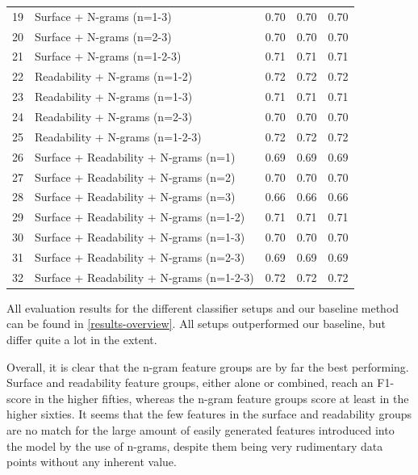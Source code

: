 \documentclass[
10pt, %
a4paper, %
oneside, %
headinclude,footinclude, %
] {book}%
\begin{document}
\begin{table}[]
\begin{tabular}{@{}lllll@{}}
19 & Surface + N-grams (n=1-3)                 & 0.70          & 0.70       & 0.70 \\
20 & Surface + N-grams (n=2-3)                 & 0.70          & 0.70       & 0.70 \\
21 & Surface + N-grams (n=1-2-3)               & 0.71          & 0.71       & 0.71 \\
22 & Readability + N-grams (n=1-2)             & 0.72          & 0.72       & 0.72 \\
23 & Readability + N-grams (n=1-3)             & 0.71          & 0.71       & 0.71 \\
24 & Readability + N-grams (n=2-3)             & 0.70          & 0.70       & 0.70 \\
25 & Readability + N-grams (n=1-2-3)           & 0.72          & 0.72       & 0.72 \\
26 & Surface + Readability + N-grams (n=1)     & 0.69          & 0.69       & 0.69 \\
27 & Surface + Readability + N-grams (n=2)     & 0.70          & 0.70       & 0.70 \\
28 & Surface + Readability + N-grams (n=3)     & 0.66          & 0.66       & 0.66 \\
29 & Surface + Readability + N-grams (n=1-2)   & 0.71          & 0.71       & 0.71 \\
30 & Surface + Readability + N-grams (n=1-3)   & 0.70          & 0.70       & 0.70 \\
31 & Surface + Readability + N-grams (n=2-3)   & 0.69          & 0.69       & 0.69 \\
32 & Surface + Readability + N-grams (n=1-2-3) & 0.72          & 0.72       & 0.72 \\ \bottomrule
\end{tabular}
\end{table}

All evaluation results for the different classifier setups and our baseline method can be found in \autoref{results-overview}. All setups outperformed our baseline, but differ quite a lot in the extent. 

Overall, it is clear that the n-gram feature groups are by far the best performing. Surface and readability feature groups, either alone or combined, reach an F1-score in the higher fifties, whereas the n-gram feature groups score at least in the higher sixties. It seems that the few features in the surface and readability groups are no match for the large amount of easily generated features introduced into the model by the use of n-grams, despite them being very rudimentary data points without any inherent value.
\end{document}
